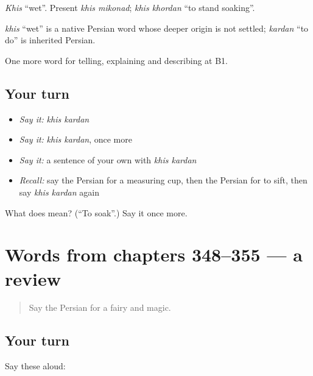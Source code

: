 \emph{Khis} \textquotedblleft{}wet\textquotedblright{}. Present \emph{khis mikonad}; \emph{khis khordan} \textquotedblleft{}to stand soaking\textquotedblright{}.

\begin{cousinweb}
\emph{khis} \textquotedblleft{}wet\textquotedblright{} is a native Persian word whose deeper origin is not settled; \emph{kardan} \textquotedblleft{}to do\textquotedblright{} is inherited Persian.
\end{cousinweb}

\begin{grammarlens}[title={What you've built}]
One more word for telling, explaining and describing at B1.
\end{grammarlens}

\subsection*{Your turn}
\begin{itemize}
\raggedright
  \item \emph{Say it:} \emph{khis kardan}
  \item \emph{Say it:} \emph{khis kardan}, once more
  \item \emph{Say it:} a sentence of your own with \emph{khis kardan}
  \item \emph{Recall:} say the Persian for a measuring cup, then the Persian for to sift, then say \emph{khis kardan} again
\end{itemize}

\begin{tcolorbox}[breakable,colback=teal!4,colframe=teal!35!black,title={Before you move on}]
What does   mean? (\textquotedblleft{}To soak\textquotedblright{}.) Say it once more.
\end{tcolorbox}
\section[(dialogue)]{Words from chapters 348–355 — a review}

\label{lesson:FA-R355-review-348-355}



\begin{quote}
Say the Persian for a fairy and magic.
\end{quote}

\subsection*{Your turn}
Say these aloud:

